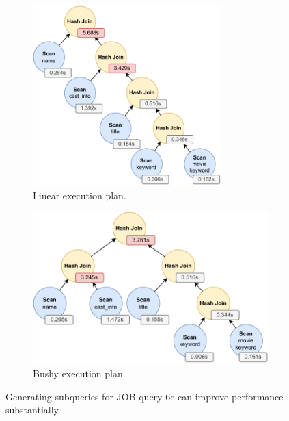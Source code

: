 \begin{figure}[tb]
	\centering
	\begin{subfigure}[b]{0.47\textwidth}
	    \centering
	    \includegraphics[width=0.8\textwidth]{figures/subquery-example-job-6c-linear.pdf}
	    \caption{Linear execution plan.}
	    \label{fig:subquery-results-linear}
	\end{subfigure}
	\begin{subfigure}[b]{0.47\textwidth}
	    \centering
	    \includegraphics[width=\textwidth]{figures/subquery-example-job-6c-subqueries.pdf}
	    \caption{Bushy execution plan}
	    \label{fig:subquery-results-bushy}
	\end{subfigure}
	\caption{Generating subqueries for JOB query 6c can improve performance substantially.}
	\label{fig:subquery-results}
	\vspace{-0.4cm}
\end{figure}


